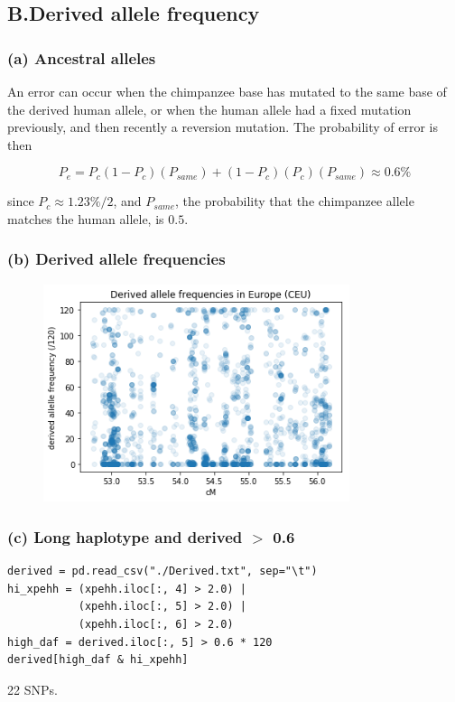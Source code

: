 \documentclass{article}[11pt]
\begin{document}
\subsection*{B.\quad Derived allele frequency}
\subsubsection*{(a) Ancestral alleles}
An error can occur when the chimpanzee base has mutated to the
same base of the derived human allele, or when the human allele
had a fixed mutation previously, and then recently a reversion
mutation. The probability of error is then

\[
    P_e = P_c(1 - P_c)(P_{same}) + (1 - P_c)(P_c)(P_{same}) \approx 0.6\%
\]

since $P_c \approx 1.23\% / 2$, and $P_{same}$, the probability
that the chimpanzee allele matches the human allele, is $0.5$.

\subsubsection*{(b) Derived allele frequencies}
\begin{figure}[H]
    \includegraphics[width=0.8\textwidth]{problem1/derived_ceu.png}
\end{figure}

\subsubsection*{(c) Long haplotype and derived $>$ 0.6}
\begin{verbatim}
derived = pd.read_csv("./Derived.txt", sep="\t")
hi_xpehh = (xpehh.iloc[:, 4] > 2.0) | 
           (xpehh.iloc[:, 5] > 2.0) |
           (xpehh.iloc[:, 6] > 2.0)
high_daf = derived.iloc[:, 5] > 0.6 * 120
derived[high_daf & hi_xpehh]
\end{verbatim}
22 SNPs.
\end{document}
